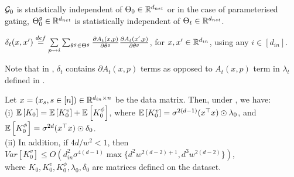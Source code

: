 \begin{assumption}\label{assmp:decouple}
$\mathcal{G}_0$ is statistically independent of $\Theta_0\in\mathbb{R}^{d_{net}}$ or in the case of parameterised gating, ${\Theta}^g_0\in\mathbb{R}^{d_{net}}$ is statistically independent of $\Theta_t\in\mathbb{R}^{d_{net}}$.
\end{assumption}
\begin{definition}\label{def:delta}
$\delta_t(x,x')\stackrel{def}= \underset{{p\rightsquigarrow i}}{\sum} \sum_{\theta^g\in{\Theta}^g}\frac{\partial A_{t}(x,p)}{\partial \theta^g} \frac{\partial A_{t}(x',p)}{\partial \theta^g}$, for $x,x'\in\mathbb{R}^{d_{in}}$, using any $i\in[d_{in}]$.
\end{definition}
Note that in , $\delta_t$ contains $\partial A_t(x,p)$ terms as opposed to $A_t(x,p)$ term in $\lambda_t$ defined in .
\begin{theorem}\label{th:main} Let $x=(x_s,s\in[n])\in \mathbb{R}^{d_{in}\times n}$ be the data matrix. Then, under , we have:\\
(i) $\mathbb{E}\left[K_0\right]=\mathbb{E}\left[K^v_0\right]+\mathbb{E}\left[K^{\phi}_0\right]$, where $\mathbb{E}\left[K^{v}_0\right]=\sigma^{2(d-1)} (x^\top x)\odot \lambda_0$, and $\mathbb{E}\left[K^{\phi}_0\right]=\sigma^{2d}  (x^\top x)\odot \delta_0$.\\
(ii) In addition, if ${4d}/{w^2}<1$, then $Var\left[K^v_0\right]\leq O\left(d^2_{in}\sigma^{4(d-1)}\max\{d^2w^{2(d-2)+1}, d^3w^{2(d-2)}\}\right)$,\\
where $K_0, K^v_0, K^{\phi}_0, \lambda_0, \delta_0$ are matrices defined on the dataset.
\end{theorem}

